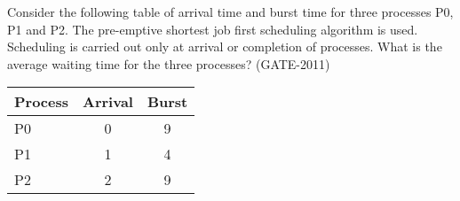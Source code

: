 \begin{questyle}

  \question  Consider the following table of arrival time and burst time for three processes P0, P1 and P2.
            The pre-emptive shortest job first scheduling algorithm is used. Scheduling is carried out only
            at arrival or completion of processes. What is the average waiting time for the three processes? (GATE-2011)

  \begin{myTableStyle}
    \begin{center}
    \begin{tabular}{ |l|c|c| } \hline
        Process &   Arrival & Burst    \\ \hline
        P0      &   0       & 9         \\ \hline
        P1      &   1       & 4         \\ \hline
        P2      &   2       & 9         \\ \hline
    \end{tabular}
    \end{center}
  \end{myTableStyle}
  \vspace{0.08in}

  \begin{oneparchoices}
  \end{oneparchoices}

\end{questyle}





